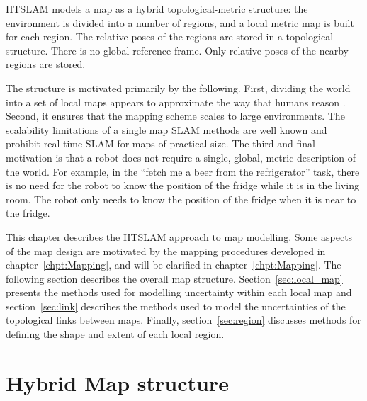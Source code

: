 HTSLAM models a map as a hybrid topological-metric structure: the
environment is divided into a number of regions, and a local metric
map is built for each region. The relative poses of the regions are
stored in a topological structure. There is no global reference
frame. Only relative poses of the nearby regions are stored.


The structure is motivated primarily by the following.
First, dividing the world into a set of local maps appears to approximate the
way that humans reason \cite{psycho_kuipers82}. Second, it ensures
that the mapping scheme scales to large environments.  The scalability
limitations of a single map SLAM methods are well known
\cite{guivant03,guivant01,guivant02} and prohibit real-time SLAM for
maps of practical size.  The third and final motivation is that a
robot does not require a single, global, metric description of the
world.  For example, in the ``fetch me a beer from the refrigerator''
task, there is no need for the robot to know the position of the
fridge while it is in the living room.  The robot only needs to know
the position of the fridge when it is near to the fridge.

This chapter describes the HTSLAM approach to map modelling.  Some
aspects of the map design are motivated by the mapping procedures
developed in chapter~\ref{chpt:Mapping}, and will be clarified in chapter~\ref{chpt:Mapping}. %
The following section describes the overall map structure.  Section~\ref{sec:local_map}
presents the methods used for modelling uncertainty within each local
map and section~\ref{sec:link} describes the methods used to model the
uncertainties of the topological links between maps.  Finally,
section~\ref{sec:region} discusses methods for defining the shape and
extent of each local region.

\section{Hybrid Map structure}
\label{sec:HM_structure}

